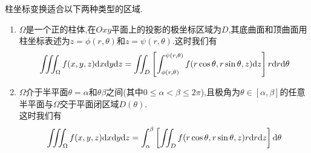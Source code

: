 \documentclass{ctexart}
\begin{document}
柱坐标变换适合以下两种类型的区域.
\begin{enumerate}[label=\tbf{(\arabic*)}]
    \item $\Omega$是一个正的柱体,在$Oxy$平面上的投影的极坐标区域为$D$,其底曲面和顶曲面用柱坐标表述为$z=\phi(r,\theta)$和$z=\psi(r,\theta)$.这时我们有
        \[\iiint_\Omega f(x,y,z)\mathrm{d} x\mathrm{d} y\mathrm{d} z=\iint_D\left[\int_{\phi(r,\theta)}^{\psi(r,\theta)}f(r\cos\theta,r\sin\theta,z)\mathrm{d} z\right]r\mathrm{d} r\mathrm{d}\theta\]
    \item $\Omega$介于半平面$\theta=\alpha$和$\theta\beta$之间(其中$0\leqslant\alpha<\beta\leqslant2\pi$),且极角为$\theta\in[\alpha,\beta]$的任意半平面与$\Omega$交于平面闭区域$D(\theta)$.\\
        这时我们有
        \[\iiint_\Omega f(x,y,z)\mathrm{d} x\mathrm{d} y\mathrm{d} z=\int_\alpha^\beta\left[\iint_Df(r\cos\theta,r\sin\theta,z)r\mathrm{d} r\mathrm{d} z\right]\mathrm{d}\theta\]
\end{enumerate}
\end{document}
